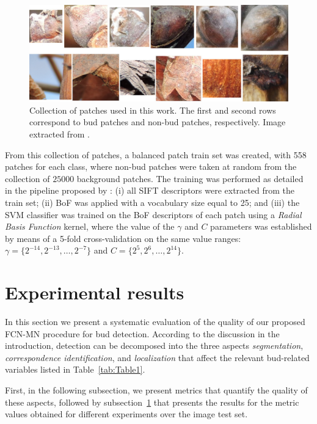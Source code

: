 \documentclass[a4paper,authoryear,review]{elsarticle}
\begin{document}
\begin{figure}
    \centering
    \includegraphics[width=12cm]{figures/Figure2.png}
    \caption{
Collection of patches used in this work. The first and second rows correspond to bud patches and non-bud patches, respectively. Image extracted from \citet{perez2017image}.
    }
    \label{fig:Figure2}
\end{figure}


From this collection of patches, a balanced patch train set was created, with 558 patches for  each class, where non-bud patches were taken at random from the collection of $25000$ background patches. The training was performed as detailed in the pipeline proposed by \citet{perez2017image}: (i) all SIFT descriptors were extracted from the train set; (ii) BoF was applied with a vocabulary size equal to 25; and (iii) the SVM classifier was trained on the BoF descriptors of each patch using a \emph{Radial Basis Function} kernel, where the value of the $\gamma$ and $C$ parameters was established by means of a 5-fold cross-validation on the same value ranges: $\gamma = \{2^{-14}, 2^{-13}, \ldots, 2^{-7}\}$ and $C = \{2^{5}, 2^{6},\ldots , 2^{14}\}$.

\section{Experimental results} 
\label{sec:results}

In this section we present a systematic evaluation of the quality of our proposed FCN-MN procedure for bud detection. According to the discussion in the introduction, detection can be decomposed into the three aspects \emph{segmentation}, \emph{correspondence identification}, and \emph{localization} that affect the relevant bud-related variables listed in Table~\ref{tab:Table1}. 

First, in the following subsection, we present metrics that quantify the quality of these aspects, followed by subsection~\ref{sec:results} that presents the results for the metric values obtained for different experiments over the image test set. 
\end{document}
